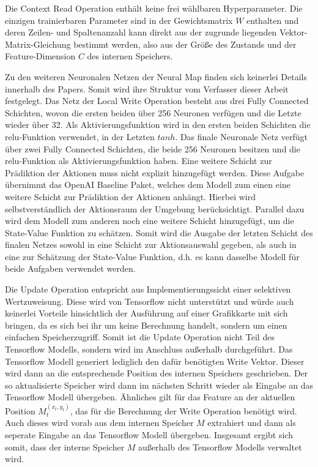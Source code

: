 Die Context Read Operation enthält keine frei wählbaren Hyperparameter. Die einzigen trainierbaren Parameter sind in der Gewichtsmatrix $W$ enthalten und deren Zeilen- und Spaltenanzahl kann direkt aus der zugrunde liegenden Vektor-Matrix-Gleichung bestimmt werden, also aus der Größe des Zustands und der Feature-Dimension $C$ des internen Speichers.

Zu den weiteren Neuronalen Netzen der Neural Map finden sich keinerlei Details innerhalb des Papers. Somit wird ihre Struktur vom Verfasser dieser Arbeit festgelegt. Das Netz der Local Write Operation besteht aus drei Fully Connected Schichten, wovon die ersten beiden über 256 Neuronen verfügen und die Letzte wieder über 32. Als Aktivierungsfunktion wird in den ersten beiden Schichten die relu-Funktion verwendet, in der Letzten $tanh$. Das finale Neuronale Netz verfügt über zwei Fully Connected Schichten, die beide 256 Neuronen besitzen und die relu-Funktion als Aktivierungsfunktion haben. Eine weitere Schicht zur Prädiktion der Aktionen muss nicht explizit hinzugefügt werden. Diese Aufgabe übernimmt das OpenAI Baseline Paket, welches dem Modell zum einen eine weitere Schicht zur Prädiktion der Aktionen anhängt. Hierbei wird selbstverständlich der Aktionsraum der Umgebung berücksichtigt. Parallel dazu wird dem Modell zum anderen noch eine weitere Schicht hinzugefügt, um die State-Value Funktion zu schätzen. Somit wird die Ausgabe der letzten Schicht des finalen Netzes sowohl in eine Schicht zur Aktionsauswahl gegeben, als auch in eine zur Schätzung der State-Value Funktion, d.h. es kann dasselbe Modell für beide Aufgaben verwendet werden.

Die Update Operation entspricht aus Implementierungssicht einer selektiven Wertzuweisung. Diese wird von Tensorflow nicht unterstützt und würde auch keinerlei Vorteile hinsichtlich der Ausführung auf einer Grafikkarte mit sich bringen, da es sich bei ihr um keine Berechnung handelt, sondern um einen einfachen Speicherzugriff. Somit ist die Update Operation nicht Teil des Tensorflow Modells, sondern wird im Anschluss außerhalb durchgeführt. Das Tensorflow Modell generiert lediglich den dafür benötigten Write Vektor. Dieser wird dann an die entsprechende Position des internen Speichers geschrieben. Der so aktualisierte Speicher wird dann im nächsten Schritt wieder als Eingabe an das Tensorflow Modell übergeben. Ähnliches gilt für das Feature an der aktuellen Position $M_t^{(x_t,y_t)}$, das für die Berechnung der Write Operation benötigt wird. Auch dieses wird vorab aus dem internen Speicher $M$ extrahiert und dann als seperate Eingabe an das Tensorflow Modell übergeben. Insgesamt ergibt sich somit, dass der interne Speicher $M$ außerhalb des Tensorflow Modells verwaltet wird.

